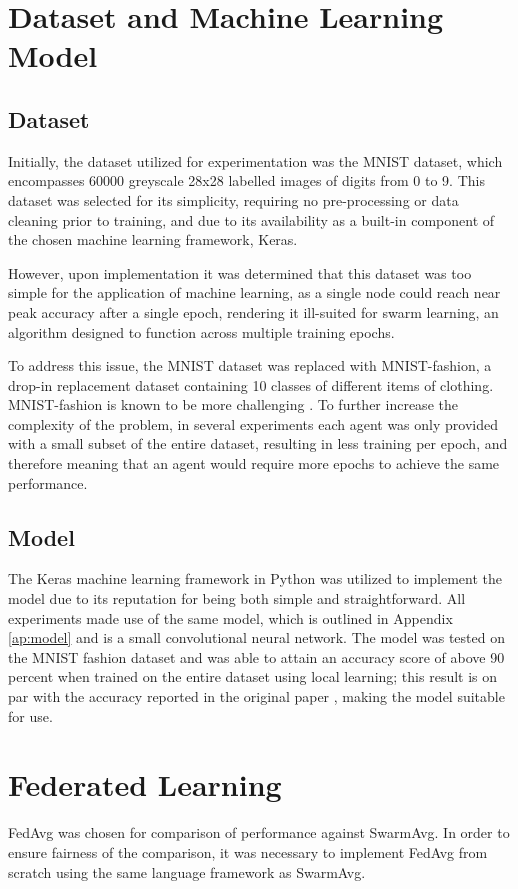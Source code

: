 \section{Dataset and Machine Learning Model}
\subsection{Dataset}
Initially, the dataset utilized for experimentation was the MNIST dataset, which encompasses 60000 greyscale 28x28 labelled images of digits from 0 to 9. This dataset was selected for its simplicity, requiring no pre-processing or data cleaning prior to training, and due to its availability as a built-in component of the chosen machine learning framework, Keras.

However, upon implementation it was determined that this dataset was too simple for the application of machine learning, as a single node could reach near peak accuracy after a single epoch, rendering it ill-suited for swarm learning, an algorithm designed to function across multiple training epochs.

To address this issue, the MNIST dataset was replaced with MNIST-fashion, a drop-in replacement dataset containing 10 classes of different items of clothing. MNIST-fashion is known to be more challenging \cite{xiao2017fashionmnist}. To further increase the complexity of the problem, in several experiments each agent was only provided with a small subset of the entire dataset, resulting in less training per epoch, and therefore meaning that an agent would require more epochs to achieve the same performance.

\subsection{Model}
The Keras machine learning framework in Python was utilized to implement the model due to its reputation for being both simple and straightforward. All experiments made use of the same model, which is outlined in Appendix \ref{ap:model} and is a small convolutional neural network. The model was tested on the MNIST fashion dataset and was able to attain an accuracy score of above 90 percent when trained on the entire dataset using local learning; this result is on par with the accuracy reported in the original paper \cite{xiao2017fashionmnist}, making the model suitable for use.


\section{Federated Learning}
FedAvg was chosen for comparison of performance against SwarmAvg. In order to ensure fairness of the comparison, it was necessary to implement FedAvg from scratch using the same language framework as SwarmAvg.
